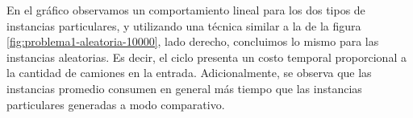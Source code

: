 En el gráfico observamos un comportamiento lineal para los dos tipos de instancias particulares, y utilizando una técnica similar a la de la figura \ref{fig:problema1-aleatoria-10000}, lado derecho, concluimos lo mismo para las instancias aleatorias. Es decir, el ciclo presenta un costo temporal proporcional a la cantidad de camiones en la entrada. Adicionalmente, se observa que las instancias promedio consumen en general más tiempo que las instancias particulares generadas a modo comparativo.






